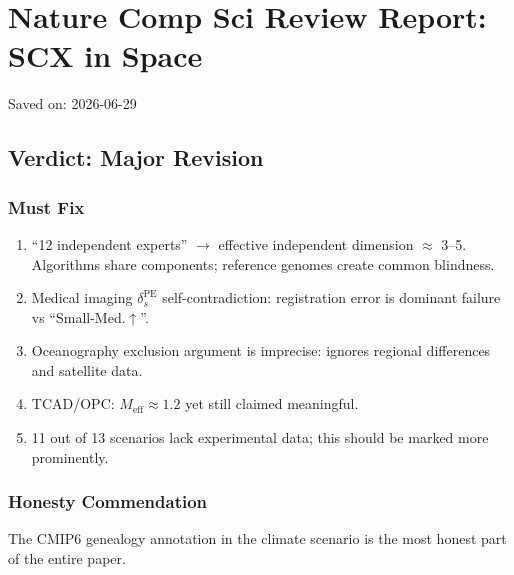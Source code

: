 \documentclass[
  12pt,
]{article}
\author{SCX}
\date{2026}
\providecommand{\tightlist}{%
  \setlength{\itemsep}{0pt}\setlength{\parskip}{0pt}}
\begin{document}
\section{Nature Comp Sci Review Report: SCX in Space}\label{nature-comp-sci-review-report-scx-in-space}

Saved on: 2026-06-29

\subsection{Verdict: Major Revision}\label{verdict-major-revision}

\subsubsection{Must Fix}\label{must-fix}

\begin{enumerate}
\def\labelenumi{\arabic{enumi}.}
\tightlist
\item
  ``12 independent experts'' $\to$ effective independent dimension $\approx$ 3--5. Algorithms share components; reference genomes create common blindness.
\item
  Medical imaging $\delta_s^{\text{PE}}$ self-contradiction: registration error is dominant failure vs ``Small-Med.$\uparrow$''.
\item
  Oceanography exclusion argument is imprecise: ignores regional differences and satellite data.
\item
  TCAD/OPC: $M_{\text{eff}}\approx 1.2$ yet still claimed meaningful.
\item
  11 out of 13 scenarios lack experimental data; this should be marked more prominently.
\end{enumerate}

\subsubsection{Honesty Commendation}\label{honesty-commendation}

The CMIP6 genealogy annotation in the climate scenario is the most honest part of the entire paper.
\end{document}
